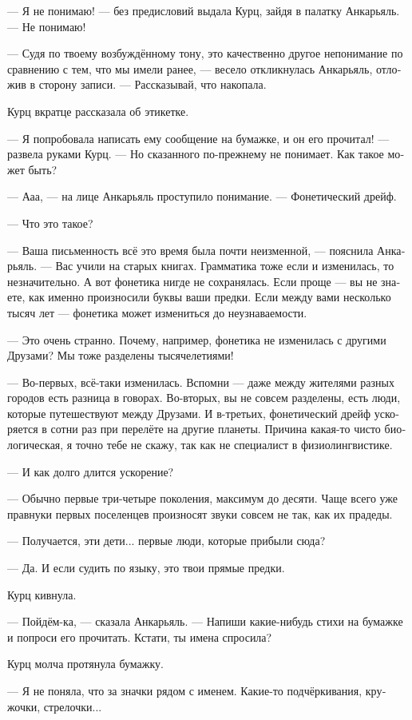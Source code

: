\documentclass[a4paper,12pt,fleqn]{book}\usepackage{polyglossia}\setdefaultlanguage[babelshorthands=true]{russian}\setotherlanguage{english}\defaultfontfeatures{Ligatures=TeX,Mapping=tex-text}\usepackage{xcolor}\newcommand{\ml}[3]{#2}
\begin{document}
--- Я не понимаю! --- без предисловий выдала Курц, зайдя в палатку Анкарьяль.
--- Не понимаю!

--- Судя по твоему возбуждённому тону, это качественно другое непонимание по сравнению с тем, что мы имели ранее, --- весело откликнулась Анкарьяль, отложив в сторону записи.
--- Рассказывай, что накопала.

Курц вкратце рассказала об этикетке.

--- Я попробовала написать ему сообщение на бумажке, и он его прочитал! --- развела руками Курц.
--- Но сказанного по-прежнему не понимает.
Как такое может быть?

--- Ааа, --- на лице Анкарьяль проступило понимание.
--- Фонетический дрейф.

--- Что это такое?

--- Ваша письменность всё это время была почти неизменной, --- пояснила Анкарьяль.
--- Вас учили на старых книгах.
Грамматика тоже если и изменилась, то незначительно.
А вот фонетика нигде не сохранялась.
Если проще --- вы не знаете, как именно произносили буквы ваши предки.
Если между вами несколько тысяч лет --- фонетика может измениться до неузнаваемости.

--- Это очень странно.
Почему, например, фонетика не изменилась с другими Друзами?
Мы тоже разделены тысячелетиями!

--- Во-первых, всё-таки изменилась.
Вспомни --- даже между жителями разных городов есть разница в говорах.
Во-вторых, вы не совсем разделены, есть люди, которые путешествуют между Друзами.
И в-третьих, фонетический дрейф ускоряется в сотни раз при перелёте на другие планеты.
Причина какая-то чисто биологическая, я точно тебе не скажу, так как не специалист в физиолингвистике.

--- И как долго длится ускорение?

--- Обычно первые три-четыре поколения, максимум до десяти.
Чаще всего уже правнуки первых поселенцев произносят звуки совсем не так, как их прадеды.

--- Получается, эти дети... первые люди, которые прибыли сюда?

--- Да.
И если судить по языку, это твои прямые предки.

Курц кивнула.

--- Пойдём-ка, --- сказала Анкарьяль.
--- Напиши какие-нибудь стихи на бумажке и попроси его прочитать.
Кстати, ты имена спросила?

Курц молча протянула бумажку.

--- Я не поняла, что за значки рядом с именем.
Какие-то подчёркивания, кружочки, стрелочки...
\end{document}

